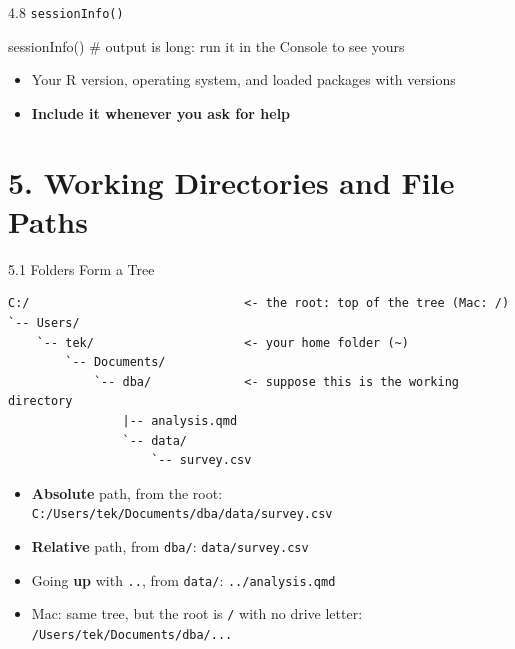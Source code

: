 \documentclass[
  ignorenonframetext,
  aspectratio=169,
]{beamer}
\newenvironment{Shaded}{\begin{snugshade}}{\end{snugshade}}
\newcommand{\CommentTok}[1]{\textcolor[rgb]{0.37,0.37,0.37}{#1}}
\newcommand{\FunctionTok}[1]{\textcolor[rgb]{0.28,0.35,0.67}{#1}}
\newcommand{\NormalTok}[1]{\textcolor[rgb]{0.00,0.23,0.31}{#1}}
\providecommand{\tightlist}{%
  \setlength{\itemsep}{0pt}\setlength{\parskip}{0pt}}
\begin{document}
\begin{frame}[fragile]{4.8 \texttt{sessionInfo()}}
\protect{}\label{sec-session-info}
\begin{Shaded}
\begin{Highlighting}[]
\FunctionTok{sessionInfo}\NormalTok{()      }\CommentTok{\# output is long: run it in the Console to see yours}
\end{Highlighting}
\end{Shaded}

\begin{itemize}
\tightlist
\item
  Your R version, operating system, and loaded packages with versions
\item
  \textbf{Include it whenever you ask for help}
\end{itemize}
\end{frame}

\section{5. Working Directories and File Paths}\label{sec-paths}

\begin{frame}[fragile]{5.1 Folders Form a Tree}
\protect{}\label{folders-form-a-tree}
\begin{verbatim}
C:/                              <- the root: top of the tree (Mac: /)
`-- Users/
    `-- tek/                     <- your home folder (~)
        `-- Documents/
            `-- dba/             <- suppose this is the working directory
                |-- analysis.qmd
                `-- data/
                    `-- survey.csv
\end{verbatim}

\begin{itemize}
\tightlist
\item
  \textbf{Absolute} path, from the root:
  \texttt{C:/Users/tek/Documents/dba/data/survey.csv}
\item
  \textbf{Relative} path, from \texttt{dba/}: \texttt{data/survey.csv}
\item
  Going \textbf{up} with \texttt{..}, from \texttt{data/}:
  \texttt{../analysis.qmd}
\item
  Mac: same tree, but the root is \texttt{/} with no drive letter:
  \texttt{/Users/tek/Documents/dba/...}
\end{itemize}
\end{frame}
\end{document}
